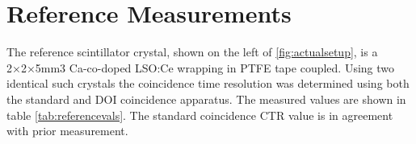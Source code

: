 \section{Reference Measurements}
The reference scintillator crystal, shown on the left of \ref{fig:actualsetup}, is a 2×2×5mm3 Ca-co-doped LSO:Ce wrapping in PTFE tape coupled. Using two identical such crystals the coincidence time resolution was determined using both the standard and DOI coincidence apparatus. The measured values are shown in table \ref{tab:referencevals}. The standard coincidence CTR value is in agreement with prior measurement\cite{arron_Meyer_Pauwels_Lecoq_2012}.